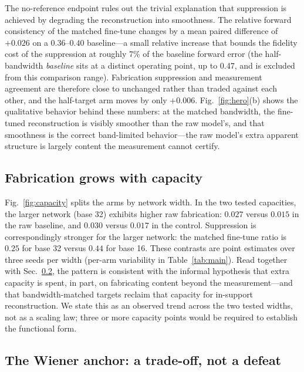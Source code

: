 The no-reference endpoint rules out the trivial explanation that suppression is achieved by degrading the reconstruction into smoothness. The relative forward consistency of the matched fine-tune changes by a mean paired difference of $+0.026$ on a $0.36$--$0.40$ baseline---a small relative increase that bounds the fidelity cost of the suppression at roughly 7\% of the baseline forward error (the half-bandwidth \emph{baseline} sits at a distinct operating point, up to $0.47$, and is excluded from this comparison range). Fabrication suppression and measurement agreement are therefore close to unchanged rather than traded against each other, and the half-target arm moves by only $+0.006$. Fig.~\ref{fig:hero}(b) shows the qualitative behavior behind these numbers: at the matched bandwidth, the fine-tuned reconstruction is visibly smoother than the raw model's, and that smoothness is the correct band-limited behavior---the raw model's extra apparent structure is largely content the measurement cannot certify.

\subsection{Fabrication grows with capacity}
\label{sec:capacity}

Fig.~\ref{fig:capacity} splits the arms by network width. In the two tested capacities, the larger network (base 32) exhibits higher raw fabrication: $0.027$ versus $0.015$ in the raw baseline, and $0.030$ versus $0.017$ in the control. Suppression is correspondingly stronger for the larger network: the matched fine-tune ratio is $0.25$ for base 32 versus $0.44$ for base 16. These contrasts are point estimates over three seeds per width (per-arm variability in Table~\ref{tab:main}). Read together with Sec.~\ref{sec:wiener}, the pattern is consistent with the informal hypothesis that extra capacity is spent, in part, on fabricating content beyond the measurement---and that bandwidth-matched targets reclaim that capacity for in-support reconstruction. We state this as an observed trend across the two tested widths, not as a scaling law; three or more capacity points would be required to establish the functional form.

\subsection{The Wiener anchor: a trade-off, not a defeat}
\label{sec:wiener}

